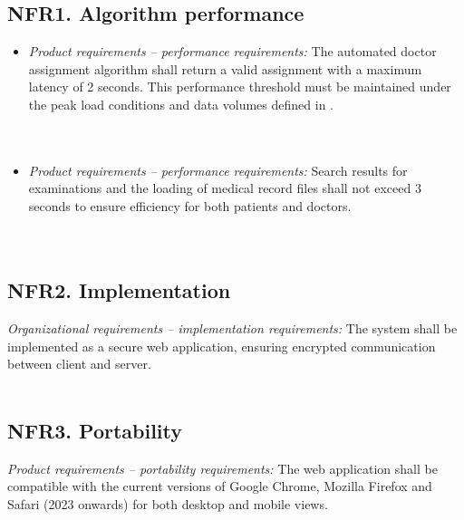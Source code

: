 \documentclass[12pt, a4paper]{article}
\begin{document}
\subsection{NFR1. Algorithm performance} \label{NFR1}
\begin{itemize}
    \item \textit{Product requirements -- performance requirements:}
        The automated doctor assignment algorithm shall return a valid assignment with a maximum latency of 2 seconds. This performance threshold must be maintained under the peak load conditions and data volumes defined in .
    \\ 
    \\ 
    \\ 
    
    \item \textit{Product requirements -- performance requirements:}
    Search results for examinations and the loading of medical record files shall not exceed 3 seconds to ensure efficiency for both patients and doctors.
    \\ 
    \\ 
    \\ 
    
\end{itemize}

\subsection{NFR2. Implementation} \label{NFR2}
    \textit{Organizational requirements -- implementation requirements:}
    The system shall be implemented as a secure web application, ensuring encrypted communication between client and server.
    \\ 
    \\ 

\subsection{NFR3. Portability} \label{NFR3}
    \textit{Product requirements -- portability requirements:}
    The web application shall be compatible with the current versions of Google Chrome, Mozilla Firefox and Safari (2023 onwards) for both desktop and mobile views.
    \\ 
\end{document}
